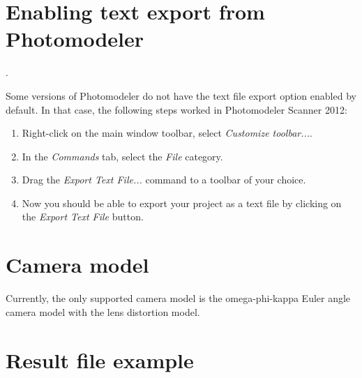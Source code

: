 \documentclass{article}
\begin{document}


\appendix

\newpage

\section{Enabling text export from Photomodeler}
\label{sec:enableTextExport}.

Some versions of Photomodeler do not have the text file export option
enabled by default. In that case, the following steps worked in
Photomodeler Scanner 2012:
\begin{enumerate}
\item Right-click on the main window toolbar, select \emph{Customize toolbar...}.
\item In the \emph{Commands} tab, select the \emph{File} category.
\item Drag the \emph{Export Text File...} command to a toolbar of
  your choice.
\item Now you should be able to export your project as a text file by
  clicking on the \emph{Export Text File} button.
\end{enumerate}


\section{Camera model}

Currently, the only supported camera model is the omega-phi-kappa
Euler angle camera model \citep[Ch.~2.1.2.3]{McGlone2004:Manual} with
the \citet{Brown1971:Close-range} lens distortion model.

\section{Result file example}
\label{sec:resultFile}

\scriptsize

\end{document}
